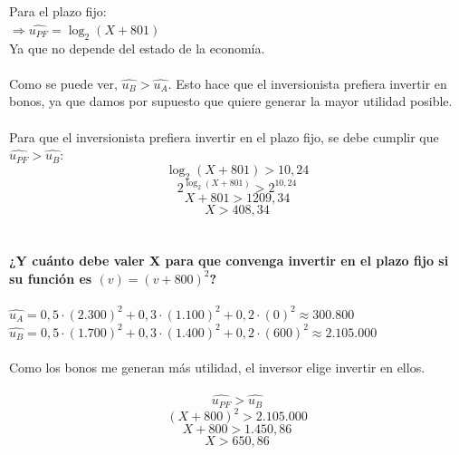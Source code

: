 \documentclass{article}
\begin{document}
        \\
        \\
        Para el plazo fijo:
        \\
        \(\Rightarrow \hat{u_{PF}} = \log_{2}(X+801)\)
        \\
        Ya que no depende del estado de la economía.
        \\
        \\
        Como se puede ver, \(\hat{u_{B}} > \hat{u_{A}}\). Esto hace que el inversionista prefiera invertir en bonos, ya que damos por supuesto que quiere generar la mayor utilidad posible.
        \\
        \\
        Para que el inversionista prefiera invertir en el plazo fijo, se debe cumplir que \(\hat{u_{PF}} > \hat{u_{B}}\):
        \\
        \[\log_{2}(X+801) > 10,24\]
        \[2^{\log_{2}(X+801)} > 2^{10,24}\]
        \[X+801 > 1209,34\]
        \[X > 408,34\]
        \\
        \\
        \textbf{¿Y cuánto debe valer X para que convenga invertir en el plazo fijo si su función es \((v)=(v+800)^{2}\)?}
        \\
        \\
        \(\hat{u_{A}} = 0,5 \cdot (2.300)^{2} + 0,3 \cdot (1.100)^{2} + 0,2 \cdot (0)^{2} \approx 300.800\)
        \\
        \(\hat{u_{B}} = 0,5 \cdot (1.700)^{2} + 0,3 \cdot (1.400)^{2} + 0,2 \cdot (600)^{2} \approx 2.105.000\)
        \\
        \\
        Como los bonos me generan más utilidad, el inversor elige invertir en ellos.
        \\
        \\
        \[\hat{u_{PF}} > \hat{u_{B}}\]
        \[(X+800)^{2} > 2.105.000\]
        \[X+800 > 1.450,86\]
        \[X > 650,86\]
\end{document}
